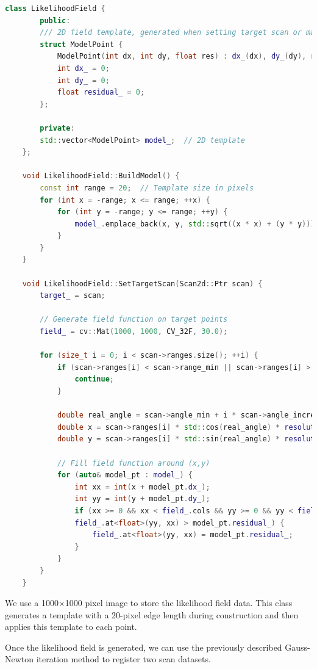 \begin{lstlisting}[language=c++,caption=src/ch6/likelihood\_field.cc]  
	class LikelihoodField {  
		public:  
		/// 2D field template, generated when setting target scan or map  
		struct ModelPoint {  
			ModelPoint(int dx, int dy, float res) : dx_(dx), dy_(dy), residual_(res) {}  
			int dx_ = 0;  
			int dy_ = 0;  
			float residual_ = 0;  
		};  
		
		private:  
		std::vector<ModelPoint> model_;  // 2D template  
	};  
	
	void LikelihoodField::BuildModel() {  
		const int range = 20;  // Template size in pixels  
		for (int x = -range; x <= range; ++x) {  
			for (int y = -range; y <= range; ++y) {  
				model_.emplace_back(x, y, std::sqrt((x * x) + (y * y)));  
			}  
		}  
	}  
	
	void LikelihoodField::SetTargetScan(Scan2d::Ptr scan) {  
		target_ = scan;  
		
		// Generate field function on target points  
		field_ = cv::Mat(1000, 1000, CV_32F, 30.0);  
		
		for (size_t i = 0; i < scan->ranges.size(); ++i) {  
			if (scan->ranges[i] < scan->range_min || scan->ranges[i] > scan->range_max) {  
				continue;  
			}  
			
			double real_angle = scan->angle_min + i * scan->angle_increment;  
			double x = scan->ranges[i] * std::cos(real_angle) * resolution_ + 500;  
			double y = scan->ranges[i] * std::sin(real_angle) * resolution_ + 500;  
			
			// Fill field function around (x,y)  
			for (auto& model_pt : model_) {  
				int xx = int(x + model_pt.dx_);  
				int yy = int(y + model_pt.dy_);  
				if (xx >= 0 && xx < field_.cols && yy >= 0 && yy < field_.rows &&  
				field_.at<float>(yy, xx) > model_pt.residual_) {  
					field_.at<float>(yy, xx) = model_pt.residual_;  
				}  
			}  
		}  
	}  
\end{lstlisting}  

We use a 1000$\times$1000 pixel image to store the likelihood field data. This class generates a template with a 20-pixel edge length during construction and then applies this template to each point.  

Once the likelihood field is generated, we can use the previously described Gauss-Newton iteration method to register two scan datasets.  

